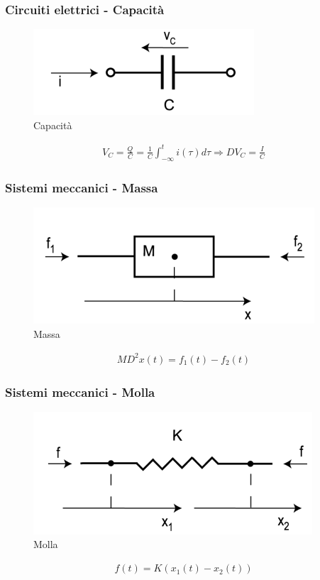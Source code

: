 \subsubsection{Circuiti elettrici - Capacità}

\begin{figure}[!ht]
	\centering
	\includegraphics[width=0.3\columnwidth]{./images/capacita.png}
	\caption{Capacità}
	\label{fig:capacita}
\end{figure}

\begin{align}
	V_C = \frac{Q}{C} = \frac{1}{C} \int_{-\infty}^{t} i(\tau) d\tau \Rightarrow DV_C = \frac{I}{C}
\end{align}

\subsubsection{Sistemi meccanici - Massa}
\begin{figure}[!ht]
	\centering
	\includegraphics[width=0.3\columnwidth]{./images/massa.png}
	\caption{Massa}
  \label{fig:massa}
\end{figure}

\begin{align}
	MD^2 x(t) = f_1(t) - f_2(t)
\end{align}

\subsubsection{Sistemi meccanici - Molla}
\begin{figure}[!ht]
	\centering
	\includegraphics[width=0.3\columnwidth]{./images/molla.png}
	\caption{Molla}
  \label{fig:molla}
\end{figure}

\begin{align}
	f(t) = K(x_1(t) - x_2(t))
\end{align}


